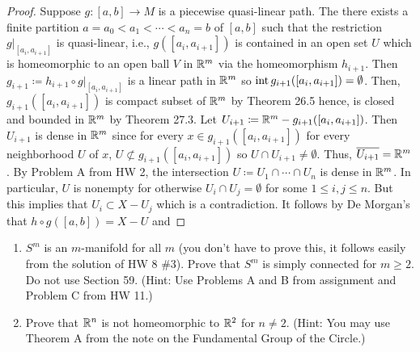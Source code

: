 \begin{proof}
Suppose $g\colon[a,b]\to M$ is a piecewise quasi-linear path. The there
exists a finite partition $a=a_0<a_1<\cdots<a_n=b$ of $[a,b]$ such that the
restriction $\left.g\right|_{[a_i,a_{i+1}]}$ is quasi-linear, i.e.,
$g([a_i,a_{i+1}])$ is contained in an open set $U$ which is homeomorphic to
an open ball $V$ in $\mathbb{R}^m$ via the homeomorphism $h_{i+1}$. Then
$g_{i+1}\coloneqq h_{i+1}\circ \left.g\right|_{[a_i,a_{i+1}]}$ is a linear
path in $\mathbb{R}^m$ so $\operatorname{int} g_{i+1}([a_i,a_{i+1}])=\emptyset$. Then,
$g_{i+1}([a_i,a_{i+1}])$ is compact subset of $\mathbb{R}^m$ by Theorem 26.5
hence, is closed and bounded in $\mathbb{R}^m$ by Theorem 27.3. Let
$U_{i+1}\coloneqq\mathbb{R}^m-g_{i+1}([a_i,a_{i+1}])$. Then $U_{i+1}$ is dense in
$\mathbb{R}^m$ since for every $x\in g_{i+1}([a_i,a_{i+1}])$ for every
neighborhood $U$ of $x$, $U\not\subset g_{i+1}([a_i,a_{i+1}])$ so $U\cap
U_{i+1}\neq\emptyset$. Thus, $\overline{U_{i+1}}=\mathbb{R}^m$. By Problem A from
HW 2, the intersection $U\coloneqq U_1\cap\cdots\cap U_n$ is dense in $\mathbb{R}^m$. In
particular, $U$ is nonempty for otherwise $U_i\cap U_j=\emptyset$ for some
$1\leq i,j\leq n$. But this implies that $U_i\subset X-U_j$ which is a
contradiction. It follows by De Morgan's that $h\circ g([a,b])=X-U$ and
\end{proof}
\newpage
\begin{problem}[C]
\begin{enumerate}[label=(\roman*)]
\item $S^m$ is an $m$-manifold for all $m$ (you don't have to prove this,
  it follows easily from the solution of HW 8 \#3). Prove that $S^m$ is
  simply connected for $m\geq 2$. Do not use Section 59. (Hint: Use
  Problems A and B from assignment and Problem C from HW 11.)
\item Prove that $\mathbb{R}^n$ is not homeomorphic to $\mathbb{R}^2$ for $n\neq
  2$. (Hint: You may use Theorem A from the note on the Fundamental Group
  of the Circle.)
\end{enumerate}
\end{problem}
